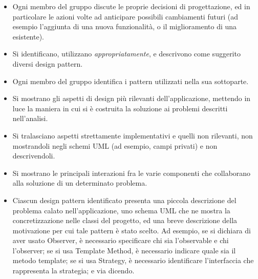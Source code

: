 \documentclass[a4paper,12pt]{report}
\begin{document}
\begin{itemize}
	\item Ogni membro del gruppo discute le proprie decisioni di progettazione, ed in particolare le azioni volte ad anticipare possibili cambiamenti futuri (ad esempio l'aggiunta di una nuova funzionalità, o il miglioramento di una esistente).
	\item Si identificano, utilizzano \textit{appropriatamente}, e descrivono come suggerito diversi design pattern.
	\item Ogni membro del gruppo identifica i pattern utilizzati nella sua sottoparte.
	\item Si mostrano gli aspetti di design più rilevanti dell'applicazione, mettendo in luce la maniera in cui si è costruita la soluzione ai problemi descritti nell'analisi.
	\item Si tralasciano aspetti strettamente implementativi e quelli non rilevanti, non mostrandoli negli schemi UML (ad esempio, campi privati) e non descrivendoli.
	\item Si mostrano le principali interazioni fra le varie componenti che collaborano alla soluzione di un determinato problema.
	\item Ciascun design pattern identificato presenta una piccola descrizione del problema calato 
nell'applicazione, uno schema UML che ne mostra la concretizzazione nelle classi del progetto, ed 
una breve descrizione della motivazione per cui tale pattern è stato scelto. Ad esempio, se si 
dichiara di aver usato Observer, è necessario specificare chi sia l'observable e chi l'observer; se 
si usa Template Method, è necessario indicare quale sia il metodo template; se si usa Strategy, è 
necessario identificare l'interfaccia che rappresenta la strategia; e via dicendo.
\end{itemize}
\end{document}
